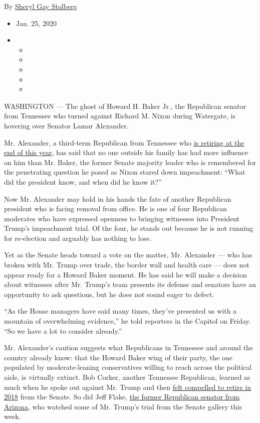 By
\href{https://www.nytimes3xbfgragh.onion/by/sheryl-gay-stolberg}{Sheryl
Gay Stolberg}

\begin{itemize}
\item
  Jan. 25, 2020
\item
  \begin{itemize}
  \item
  \item
  \item
  \item
  \item
  \end{itemize}
\end{itemize}

WASHINGTON --- The ghost of Howard H. Baker Jr., the Republican senator
from Tennessee who turned against Richard M. Nixon during Watergate, is
hovering over Senator Lamar Alexander.

Mr. Alexander, a third-term Republican from Tennessee who
\href{https://www.nytimes3xbfgragh.onion/2018/12/17/us/politics/lamar-alexander-re-election.html}{is
retiring at the end of this year}, has said that no one outside his
family has had more influence on him than Mr. Baker, the former Senate
majority leader who is remembered for the penetrating question he posed
as Nixon stared down impeachment: ``What did the president know, and
when did he know it?''

Now Mr. Alexander may hold in his hands the fate of another Republican
president who is facing removal from office. He is one of four
Republican moderates who have expressed openness to bringing witnesses
into President Trump's impeachment trial. Of the four, he stands out
because he is not running for re-election and arguably has nothing to
lose.

Yet as the Senate heads toward a vote on the matter, Mr. Alexander ---
who has broken with Mr. Trump over trade, the border wall and health
care --- does not appear ready for a Howard Baker moment. He has said he
will make a decision about witnesses after Mr. Trump's team presents its
defense and senators have an opportunity to ask questions, but he does
not sound eager to defect.

``As the House managers have said many times, they've presented us with
a mountain of overwhelming evidence,'' he told reporters in the Capitol
on Friday. ``So we have a lot to consider already.''

Mr. Alexander's caution suggests what Republicans in Tennessee and
around the country already know: that the Howard Baker wing of their
party, the one populated by moderate-leaning conservatives willing to
reach across the political aisle, is virtually extinct. Bob Corker,
another Tennessee Republican, learned as much when he spoke out against
Mr. Trump and then
\href{https://www.nytimes3xbfgragh.onion/2018/02/13/us/politics/corker-retirement-trump.html}{felt
compelled to retire in 2018} from the Senate. So did Jeff Flake,
\href{https://www.nytimes3xbfgragh.onion/2017/10/24/us/politics/jeff-flake-arizona.html}{the
former Republican senator from Arizona}, who watched some of Mr. Trump's
trial from the Senate gallery this week.

